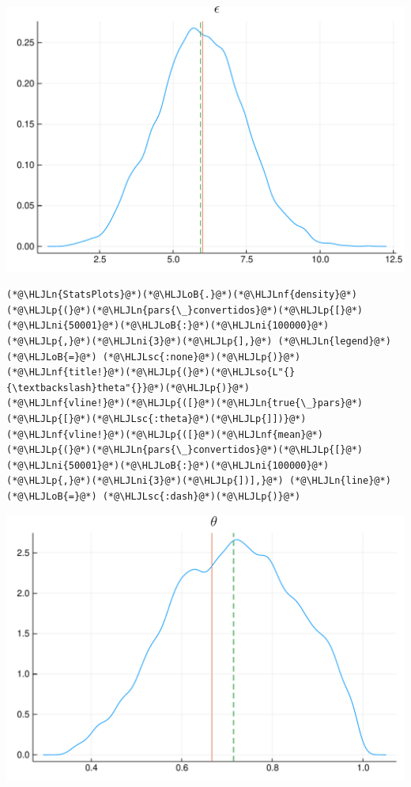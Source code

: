 \documentclass[12pt,a4paper]{article}
\newcommand{\HLJLn}[1]{#1}
\newcommand{\HLJLnf}[1]{\textcolor[RGB]{66,102,213}{#1}}
\newcommand{\HLJLsc}[1]{\textcolor[RGB]{201,61,57}{#1}}
\newcommand{\HLJLso}[1]{\textcolor[RGB]{201,61,57}{#1}}
\newcommand{\HLJLni}[1]{\textcolor[RGB]{59,151,46}{#1}}
\newcommand{\HLJLoB}[1]{\textcolor[RGB]{102,102,102}{\textbf{#1}}}
\newcommand{\HLJLp}[1]{#1}
\begin{document}
\includegraphics[width=\linewidth]{figures/dsge_and_julia_26_1.pdf}

\begin{lstlisting}
(*@\HLJLn{StatsPlots}@*)(*@\HLJLoB{.}@*)(*@\HLJLnf{density}@*)(*@\HLJLp{(}@*)(*@\HLJLn{pars{\_}convertidos}@*)(*@\HLJLp{[}@*)(*@\HLJLni{50001}@*)(*@\HLJLoB{:}@*)(*@\HLJLni{100000}@*)(*@\HLJLp{,}@*)(*@\HLJLni{3}@*)(*@\HLJLp{],}@*) (*@\HLJLn{legend}@*) (*@\HLJLoB{=}@*) (*@\HLJLsc{:none}@*)(*@\HLJLp{)}@*)
(*@\HLJLnf{title!}@*)(*@\HLJLp{(}@*)(*@\HLJLso{L"{}{\textbackslash}theta"{}}@*)(*@\HLJLp{)}@*)
(*@\HLJLnf{vline!}@*)(*@\HLJLp{([}@*)(*@\HLJLn{true{\_}pars}@*)(*@\HLJLp{[}@*)(*@\HLJLsc{:theta}@*)(*@\HLJLp{]])}@*)
(*@\HLJLnf{vline!}@*)(*@\HLJLp{([}@*)(*@\HLJLnf{mean}@*)(*@\HLJLp{(}@*)(*@\HLJLn{pars{\_}convertidos}@*)(*@\HLJLp{[}@*)(*@\HLJLni{50001}@*)(*@\HLJLoB{:}@*)(*@\HLJLni{100000}@*)(*@\HLJLp{,}@*)(*@\HLJLni{3}@*)(*@\HLJLp{])],}@*) (*@\HLJLn{line}@*) (*@\HLJLoB{=}@*) (*@\HLJLsc{:dash}@*)(*@\HLJLp{)}@*)
\end{lstlisting}

\includegraphics[width=\linewidth]{figures/dsge_and_julia_27_1.pdf}
\end{document}
